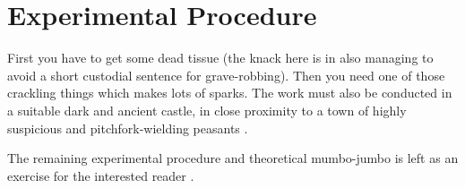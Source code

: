 
\chapter{Experimental Procedure}

First you have to get some dead tissue (the knack here is in also managing to
avoid a short custodial sentence for grave-robbing). Then you need one of
those crackling things which makes lots of sparks. The work must also be
conducted in a suitable dark and ancient castle, in close proximity to a town
of highly suspicious and pitchfork-wielding peasants \citep{norman2013design}.

The remaining experimental procedure and theoretical mumbo-jumbo is left as an
exercise for the interested reader \citep{baars2008management}.
